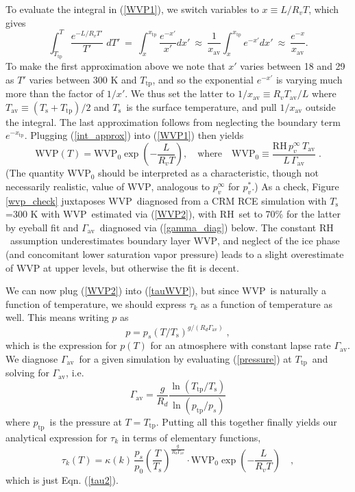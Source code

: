 \documentclass[10pt]{article}
\newcommand{\beqn}{\begin{equation}}
\newcommand{\eeqn}{\end{equation}}
\newcommand{\eqnref}[1]{(\ref{#1})}
\newcommand{\n}{\nonumber}
\newcommand{\Tav}{\ensuremath{T_\mathrm{av}}}
\newcommand{\Ts}{\ensuremath{T_\mathrm{s}}}
\newcommand{\ps}{\ensuremath{p_s}}
\newcommand{\RH}{\ensuremath{\mathrm{RH}}}
\newcommand{\WVP}{\ensuremath{\mathrm{WVP}}}
\newcommand{\Ttp}{\ensuremath{T_\mathrm{tp}}}
\newcommand{\ptp}{\ensuremath{p_\mathrm{tp}}}
\newcommand{\gammaav}{\ensuremath{\Gamma_\mathrm{av}}}
\begin{document}
	To evaluate the integral in \eqnref{WVP1}, we switch variables to $x\equiv L/R_v T$, which gives
	\beqn
		\int^T_{\Ttp} \frac{e^{-L/R_v T'}}{T'}\; dT' \ = \ \int_x^{x_\mathrm{tp}} \frac{e^{-x'}}{x'} dx' \ \approx\ \frac{1}{x_{\mathrm{av}}}\int_x^{x_\mathrm{tp}} e^{-x'} dx' \ \approx\ \frac{e^{-x}}{x_{\mathrm{av}}}.
		\label{int_approx}
	\eeqn
To make the first approximation above we note that $x'$ varies between 18 and 29 as $T'$ varies between $300$ K and $\Ttp$, and so the exponential $e^{-x'}$ is varying much more than the factor of $1/x'$. We thus set the latter  to $1/x_{\mathrm{av}}\equiv R_v \Tav/L$ where $\Tav \equiv (\Ts + \Ttp)/2$ and \Ts\ is the surface temperature, and pull $1/x_{\mathrm{av}}$ outside the integral. The last approximation follows from neglecting the boundary term $e^{-x_\mathrm{tp}}$. Plugging \eqnref{int_approx} into \eqnref{WVP1} then yields 		\beqn
		\WVP(T) =\WVP_0\exp\left(-\frac{L}{R_vT}\right),\quad \mbox{where}\quad  \WVP_0 \equiv \frac{\RH\, p_v^\infty\, \Tav}{L\,\gammaav} \; .
	\label{WVP2}
	\eeqn
(The quantity $\WVP_0$ should be interpreted as a characteristic, though not necessarily realistic, value of \WVP, analogous to $p_v^\infty$ for $p_v^*$.)  As a  check, Figure \ref{wvp_check} juxtaposes \WVP\ diagnosed from a CRM RCE simulation with \Ts=300 K with \WVP\ estimated via \eqnref{WVP2}, with \RH\ set to 70\% for the latter by eyeball fit and \gammaav\ diagnosed via \eqnref{gamma_diag} below. The constant \RH\ assumption underestimates boundary layer \WVP, and neglect of the ice phase (and concomitant lower saturation vapor pressure) leads to a slight overestimate of WVP at upper levels, but otherwise the fit is decent.

 We can now  plug \eqnref{WVP2} into \eqnref{tauWVP}, but  since \WVP\ is naturally a function of temperature, we should express $\tau_k$ as a function of temperature as well. This means writing $p$ as 
	\beqn
		p=\ps(T/\Ts)^{g/(R_d\gammaav)} \; ,
	\label{pressure}
	\eeqn 
	which is the expression for $p(T)$ for an atmosphere with constant lapse rate $\gammaav$. We diagnose \gammaav\ for a given simulation by evaluating \eqnref{pressure} at \Ttp\ and solving for  \gammaav, i.e.
	\beqn
		\gammaav = \frac{g}{R_d}\frac{\ln (\Ttp/\Ts)}{\ln(\ptp/\ps)}
	\label{gamma_diag}
	\eeqn
	where \ptp\ is the pressure at $T=\Ttp$. Putting all this together finally yields our  analytical expression for $\tau_k$ in terms of elementary functions,
	\beqn
		\tau_k(T) = \kappa(k)\,  \frac{\ps}{p_0}\left(\frac{T}{\Ts}\right)^{\frac{g}{R_d\gammaav}}\cdot \WVP_0\exp\left(-\frac{L}{R_v T}\right) \quad ,
	\n
	\eeqn
which is just Eqn. \eqnref{tau2}. 
\end{document}

